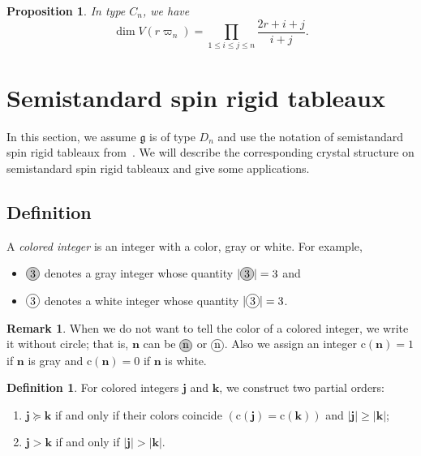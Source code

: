 \documentclass[11pt, leqno]{amsart}
\theoremstyle{plain}
\newtheorem{proposition}[theorem]{Proposition}
\theoremstyle{definition}
\newtheorem{definition}[theorem]{Definition}
\newtheorem{remark}[theorem]{Remark}
\numberwithin{equation}{section}
\newcommand{\g}{\mathfrak{g}}
\newcommand{\fw}{\varpi} %
\newcommand{\cn}[1]{\mathbf{#1}}
\newcommand{\clr}{\mathrm{c}}
\newcommand*\gn[1]{\tikz[baseline=(char.base)]{%
            \node[shape=circle,fill=gray!40,draw,inner sep=1.3pt] (char) {#1};}}
\newcommand*\nn[1]{\tikz[baseline=(char.base)]{%
            \node[shape=circle,draw,inner sep=1.3pt] (char) {#1};}}
\newcommand{\defn}[1]{{\color{darkred}\emph{#1}}} %
\begin{document}
\begin{proposition}
In type $C_n$, we have
\[
\dim V(r\fw_n) = \prod_{1\leq i \leq j \leq n} \dfrac{2r+i+j}{i+j}.
\]
\end{proposition}










\section{Semistandard spin rigid tableaux}
\label{sec:spin_rigid_tableaux}

In this section, we assume $\g$ is of type $D_n$ and use the notation of semistandard spin rigid tableaux from~\cite{KLO17}. We will describe the corresponding crystal structure on semistandard spin rigid tableaux and give some applications.

\subsection{Definition}

A \defn{colored integer} is an integer with a color, gray or white. For example,
\begin{itemize}
\item $\gn{3}$ denotes a gray integer whose quantity $|\gn{3}| = 3$ and
\item $\nn{3}$ denotes a white integer whose quantity $|\nn{3}| = 3$.
\end{itemize}

\begin{remark}
When we do not want to tell the color of a colored integer, we write it without circle; that is, $\cn{n}$ can be
$\gn{n}$ or $\nn{n}$.  Also we assign an integer $\clr(\cn{n})=1$ if $\cn{n}$ is gray and $\clr(\cn{n})=0$ if $\cn{n}$ is white.
\end{remark}

\begin{definition}
For colored integers $\cn{j}$ and $\cn{k}$, we construct two partial orders:
\begin{enumerate}
\item $\cn{j} \succeq \cn{k}$ if and only if their colors coincide $(\clr(\cn{j})=\clr(\cn{k}))$ and $|\cn{j}| \ge |\cn{k}|$;
\item $\cn{j} > \cn{k}$ if and only if $|\cn{j}| > |\cn{k}|$.
\end{enumerate}
\end{definition}
\end{document}
